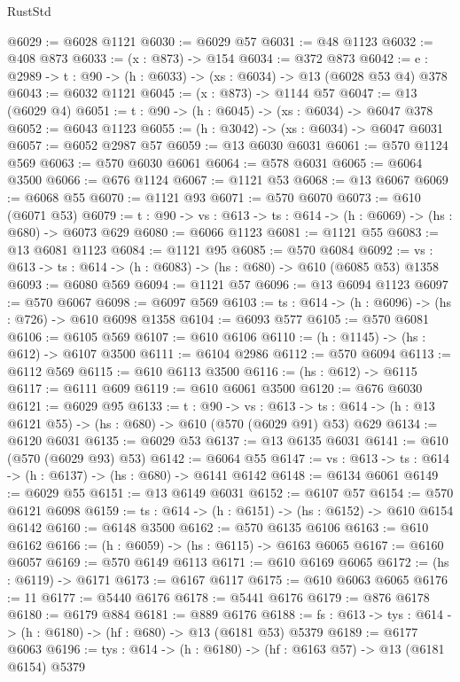 \begin{lexlean}{RustStd}
\begin{coremodule}
@6029 := @6028 @1121
@6030 := @6029 @57
@6031 := @48 @1123
@6032 := @408 @873
@6033 := (x : @873) -> @154
@6034 := @372 @873
@6042 := {e : @2989} -> {t : @90} -> (h : @6033) -> (xs : @6034) -> @13 (@6028 @53 @4) @378
@6043 := @6032 @1121
@6045 := (x : @873) -> @1144 @57
@6047 := @13 (@6029 @4)
@6051 := {t : @90} -> (h : @6045) -> (xs : @6034) -> @6047 @378
@6052 := @6043 @1123
@6055 := (h : @3042) -> (xs : @6034) -> @6047 @6031
@6057 := @6052 @2987 @57
@6059 := @13 @6030 @6031
@6061 := @570 @1124 @569
@6063 := @570 @6030 @6061
@6064 := @578 @6031
@6065 := @6064 @3500
@6066 := @676 @1124
@6067 := @1121 @53
@6068 := @13 @6067
@6069 := @6068 @55
@6070 := @1121 @93
@6071 := @570 @6070
@6073 := @610 (@6071 @53)
@6079 := {t : @90} -> {vs : @613} -> {ts : @614} -> (h : @6069) -> (hs : @680) -> @6073 @629
@6080 := @6066 @1123
@6081 := @1121 @55
@6083 := @13 @6081 @1123
@6084 := @1121 @95
@6085 := @570 @6084
@6092 := {vs : @613} -> {ts : @614} -> (h : @6083) -> (hs : @680) -> @610 (@6085 @53) @1358
@6093 := @6080 @569
@6094 := @1121 @57
@6096 := @13 @6094 @1123
@6097 := @570 @6067
@6098 := @6097 @569
@6103 := {ts : @614} -> (h : @6096) -> (hs : @726) -> @610 @6098 @1358
@6104 := @6093 @577
@6105 := @570 @6081
@6106 := @6105 @569
@6107 := @610 @6106
@6110 := (h : @1145) -> (hs : @612) -> @6107 @3500
@6111 := @6104 @2986
@6112 := @570 @6094
@6113 := @6112 @569
@6115 := @610 @6113 @3500
@6116 := (hs : @612) -> @6115
@6117 := @6111 @609
@6119 := @610 @6061 @3500
@6120 := @676 @6030
@6121 := @6029 @95
@6133 := {t : @90} ->
  {vs : @613} ->
  {ts : @614} -> (h : @13 @6121 @55) -> (hs : @680) -> @610 (@570 (@6029 @91) @53) @629
@6134 := @6120 @6031
@6135 := @6029 @53
@6137 := @13 @6135 @6031
@6141 := @610 (@570 (@6029 @93) @53)
@6142 := @6064 @55
@6147 := {vs : @613} -> {ts : @614} -> (h : @6137) -> (hs : @680) -> @6141 @6142
@6148 := @6134 @6061
@6149 := @6029 @55
@6151 := @13 @6149 @6031
@6152 := @6107 @57
@6154 := @570 @6121 @6098
@6159 := {ts : @614} -> (h : @6151) -> (hs : @6152) -> @610 @6154 @6142
@6160 := @6148 @3500
@6162 := @570 @6135 @6106
@6163 := @610 @6162
@6166 := (h : @6059) -> (hs : @6115) -> @6163 @6065
@6167 := @6160 @6057
@6169 := @570 @6149 @6113
@6171 := @610 @6169 @6065
@6172 := (hs : @6119) -> @6171
@6173 := @6167 @6117
@6175 := @610 @6063 @6065
@6176 := 11
@6177 := @5440 @6176
@6178 := @5441 @6176
@6179 := @876 @6178
@6180 := @6179 @884
@6181 := @889 @6176
@6188 := {fs : @613} -> {tys : @614} -> (h : @6180) -> (hf : @680) -> @13 (@6181 @53) @5379
@6189 := @6177 @6063
@6196 := {tys : @614} -> (h : @6180) -> (hf : @6163 @57) -> @13 (@6181 @6154) @5379

\end{coremodule}
\end{lexlean}
